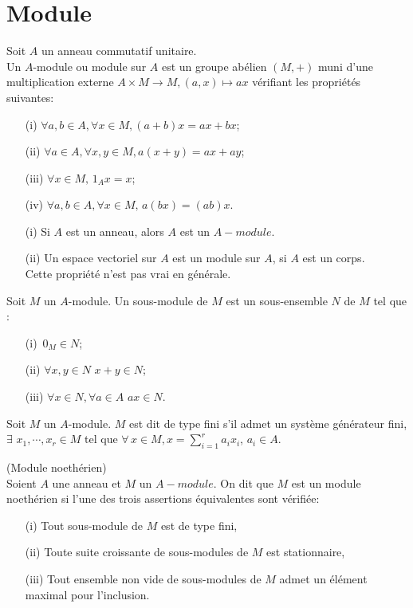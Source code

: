 \section{Module}
\begin{madefinition}
	Soit $A$ un anneau commutatif unitaire.\\
	Un $A$-module ou module sur $A$ est un groupe abélien $(M,+)$ muni d'une multiplication externe $A \times M \rightarrow M, (a,x) \mapsto ax$ vérifiant les propriétés suivantes:
	\begin{enumerate}
		\item[(i)]$ \forall a, b \in A, \forall x \in M,(a+b)x = ax+bx$;
		\item[(ii)] $ \forall a \in A, \forall x, y \in M,a(x+y) = ax+ay$;
		\item[(iii)] $ \forall x \in M, \,1_A x = x$;
		\item[(iv)] $\forall a, b \in A, \forall x \in M, \, a(bx)=(ab)x$.
	\end{enumerate}
\end{madefinition}
\begin{maremarque}
	\begin{enumerate}
		\item[(i)] Si $A$ est un anneau, alors $A$ est un $A-module$.
		\item[(ii)] Un espace vectoriel sur $A$ est un module sur $A$, si $A$ est un corps.\\ Cette propriété n'est pas vrai en générale.
	\end{enumerate}
\end{maremarque}
\begin{madefinition}
	Soit $M$ un $A$-module. Un sous-module de $M$ est un sous-ensemble $N$ de $M$ tel que :
	\begin{enumerate}
		\item[(i)]$ \, 0_M \in N$;
		\item[(ii)]$ \forall x, y \in N \, \, x+y \in N$;
		\item[(iii)] $\forall x \in N, \forall a \in A \, \, ax \in N$.
	\end{enumerate}
\end{madefinition}
\begin{madefinition}
	Soit $M$ un $A$-module. $M$ est dit de type fini s'il admet un système générateur fini, $\exists \, \, x_1, \cdots ,x_r \in M$ tel que $\forall \,  x \in M, x = \displaystyle \sum_{i=1}^{r}{a_i x_i}$, $a_i \in A$.
\end{madefinition}
\begin{maproposition}
	(Module noethérien)\\
	Soient $A$ une anneau et $M$ un $A-module$. On dit que $M$ est un module noethérien si l'une des trois assertions équivalentes sont vérifiée:
	\begin{enumerate}
		\item[(i)] Tout sous-module de $M$ est de type fini,
		\item[(ii)] Toute suite croissante de sous-modules de $M$ est stationnaire,
		\item[(iii)] Tout ensemble non vide de sous-modules de $M$ admet un élément maximal pour l'inclusion.
	\end{enumerate} 
\end{maproposition}
